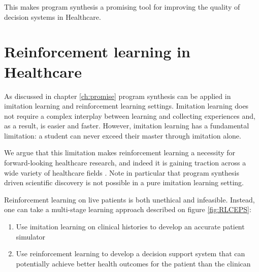 This makes program synthesis a promising tool for improving the quality of decision systems in Healthcare.

\section{Reinforcement learning in Healthcare}
\label{sec:rl-health}

As discussed in chapter \ref{ch:promise} program synthesis can be applied in imitation learning and reinforcement learning settings.
Imitation learning does not require a complex interplay between learning and collecting experiences and, as a result, is easier and faster.
However, imitation learning has a fundamental limitation: a student can never exceed their master through imitation alone.

We argue that this limitation makes reinforcement learning a necessity for forward-looking healthcare research, and indeed it is gaining traction across a wide variety of healthcare fields \cite{yuReinforcementLearningHealthcare2021}.
Note in particular that program synthesis driven scientific discovery is not possible in a pure imitation learning setting.

Reinforcement learning on live patients is both unethical and infeasible.
Instead, one can take a multi-stage learning approach described on figure \ref{fig:RLCEPS}: 
\begin{enumerate}
  \item Use imitation learning on clinical histories to develop an accurate patient simulator
  \item Use reinforcement learning to develop a decision support system that can potentially achieve better health outcomes for the patient than the clinican
\end{enumerate}

